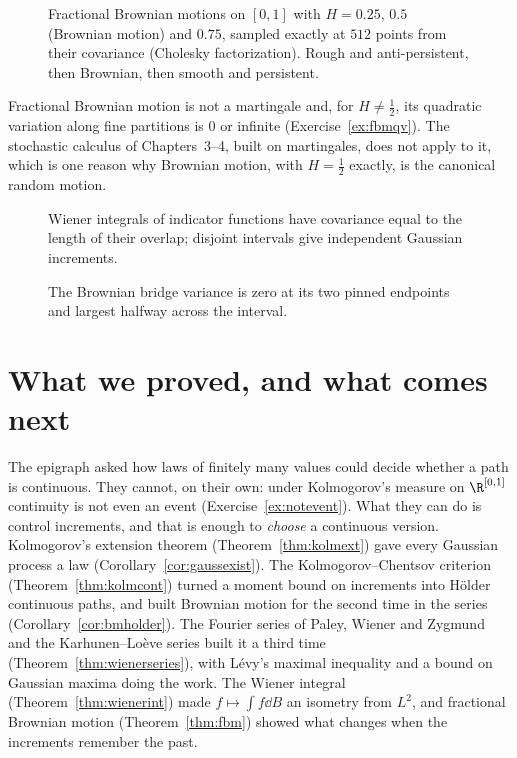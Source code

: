 \begin{figure}[ht]
\centering
{}
\caption{Fractional Brownian motions on $[0,1]$ with $H=0.25$, $0.5$ (Brownian motion) and $0.75$, sampled exactly at $512$ points from their covariance (Cholesky factorization). Rough and anti-persistent, then
Brownian, then smooth and persistent.}
\label{fig:fbm}
\end{figure}

\begin{remark}
Fractional Brownian motion is not a martingale and, for $H\neq\frac12$, its quadratic variation along fine partitions is $0$ or infinite (Exercise~\ref{ex:fbmqv}). The stochastic calculus of Chapters~3--4, built on
martingales, does not apply to it, which is one reason why Brownian motion, with $H=\frac12$ exactly, is the canonical random motion.
\end{remark}

\begin{figure}[ht]
\centering
{}
\caption{Wiener integrals of indicator functions have covariance equal to the length of their overlap; disjoint intervals give independent Gaussian increments.}
\label{fig:v12covoverlap}
\end{figure}

\begin{figure}[ht]
\centering
{}
\caption{The Brownian bridge variance is zero at its two pinned endpoints and largest halfway across the interval.}
\label{fig:v12bridgevariance}
\end{figure}

\section{What we proved, and what comes next}

The epigraph asked how laws of finitely many values could decide whether a path is continuous. They cannot, on their own: under Kolmogorov's measure on
$\R^{[0,1]}$ continuity is not even an event (Exercise~\ref{ex:notevent}). What they can do is control increments, and that is enough to \emph{choose} a
continuous version. Kolmogorov's extension theorem (Theorem~\ref{thm:kolmext}) gave every Gaussian process a law (Corollary~\ref{cor:gaussexist}).
The Kolmogorov--Chentsov criterion (Theorem~\ref{thm:kolmcont}) turned a moment bound on increments into H\"older continuous paths, and built Brownian
motion for the second time in the series (Corollary~\ref{cor:bmholder}). The Fourier series of Paley, Wiener and Zygmund and the Karhunen--Lo\`eve series
built it a third time (Theorem~\ref{thm:wienerseries}), with L\'evy's maximal inequality and a bound on Gaussian maxima doing the work. The Wiener integral
(Theorem~\ref{thm:wienerint}) made $f\mapsto\int f\dd B$ an isometry from $L^2$, and fractional Brownian motion (Theorem~\ref{thm:fbm}) showed what
changes when the increments remember the past.

